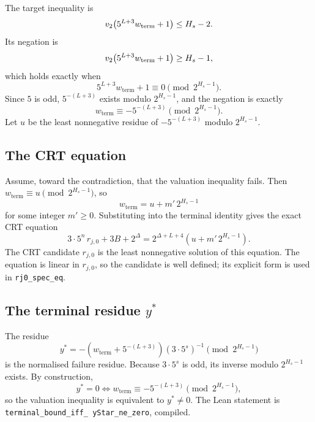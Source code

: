 The target inequality is
\begin{equation*}
  v_2\!\left(5^{L+3}w_{\mathrm{term}}+1\right)\le H_s-2.
\end{equation*}
Its negation is
\begin{equation*}
  v_2\!\left(5^{L+3}w_{\mathrm{term}}+1\right)\ge H_s-1,
\end{equation*}
which holds exactly when
\begin{equation*}
  5^{L+3}w_{\mathrm{term}}+1\equiv0\pmod{2^{H_s-1}}.
\end{equation*}
Since $5$ is odd, $5^{-(L+3)}$ exists modulo $2^{H_s-1}$, and the
negation is exactly
\begin{equation*}
  w_{\mathrm{term}}\equiv-5^{-(L+3)}
  \pmod{2^{H_s-1}}.
\end{equation*}
Let $u$ be the least nonnegative residue of $-5^{-(L+3)}$ modulo
$2^{H_s-1}$.

\subsection{The CRT equation}

Assume, toward the contradiction, that the valuation inequality fails.
Then $w_{\mathrm{term}}\equiv u\pmod{2^{H_s-1}}$, so
\begin{equation*}
  w_{\mathrm{term}}=u+m'\,2^{H_s-1}
\end{equation*}
for some integer $m'\ge0$.  Substituting into the terminal identity
gives the exact CRT equation
\begin{equation*}
  3\cdot5^n\,r_{j,0}+3B+2^{\Delta}
    =2^{\Delta+L+4}\left(u+m'\,2^{H_s-1}\right).
\end{equation*}
The CRT candidate $r_{j,0}$ is the least nonnegative solution of this
equation.  The equation is linear in $r_{j,0}$, so the candidate is
well defined; its explicit form is used in
\texttt{rj0\_\allowbreak spec\_\allowbreak eq}.

\subsection{The terminal residue $y^*$}

The residue
\begin{equation*}
  y^*=
  -\left(w_{\mathrm{term}}+5^{-(L+3)}\right)
  \left(3\cdot5^s\right)^{-1}
  \pmod{2^{H_s-1}}
\end{equation*}
is the normalised failure residue.  Because $3\cdot5^s$ is odd, its
inverse modulo $2^{H_s-1}$ exists.  By construction,
\begin{equation*}
  y^*=0\iff w_{\mathrm{term}}\equiv-5^{-(L+3)}
  \pmod{2^{H_s-1}},
\end{equation*}
so the valuation inequality is equivalent to $y^*\ne0$.  The Lean
statement is
\texttt{terminal\_\allowbreak bound\_\allowbreak iff\_\allowbreak
yStar\_\allowbreak ne\_\allowbreak zero}, compiled.

